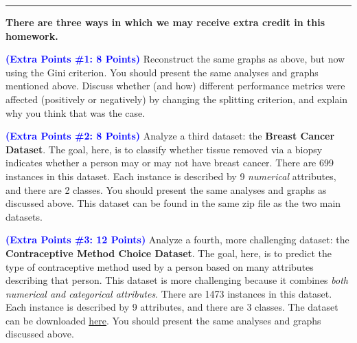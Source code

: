 \documentclass[letterpaper]{article}
\newcommand{\HIGHLIGHT}[1]{\textcolor{blue}{\textbf{#1}}}
\begin{document}
\vspace{1cm}
\noindent\rule{\textwidth}{1pt}

\textbf{There are three ways in which we may receive extra credit in this homework.}

\noindent \HIGHLIGHT{(Extra Points \#1: 8 Points)} Reconstruct the same graphs as above, but now using the Gini criterion. You should present the same analyses and graphs mentioned above. Discuss whether (and how) different performance metrics were affected (positively or negatively) by changing the splitting criterion, and explain why you think that was the case.

\noindent \HIGHLIGHT{(Extra Points \#2: 8 Points)}
Analyze a third dataset: the \textbf{Breast Cancer Dataset}. The goal, here, is to classify whether tissue removed via a biopsy indicates whether a person may or may not have breast cancer. There are 699 instances in this dataset. Each instance is described by 9 \textit{numerical} attributes, and there are 2 classes. You should present the same analyses and graphs as discussed above. This dataset can be found in the same zip file as the two main datasets.


\noindent \HIGHLIGHT{(Extra Points \#3: 12 Points)}    
Analyze a fourth, more challenging dataset: the \textbf{Contraceptive Method Choice Dataset}. The goal, here, is to predict the type of contraceptive method used by a person based on many attributes describing that person. This dataset is more challenging because it combines \textit{both numerical and categorical attributes}. There are 1473 instances in this dataset. Each instance is described by 9 attributes, and there are 3 classes. The dataset can be downloaded \href{https://archive.ics.uci.edu/ml/datasets/Contraceptive+Method+Choice}{here}. You should present the same analyses and graphs discussed above.
\end{document}
